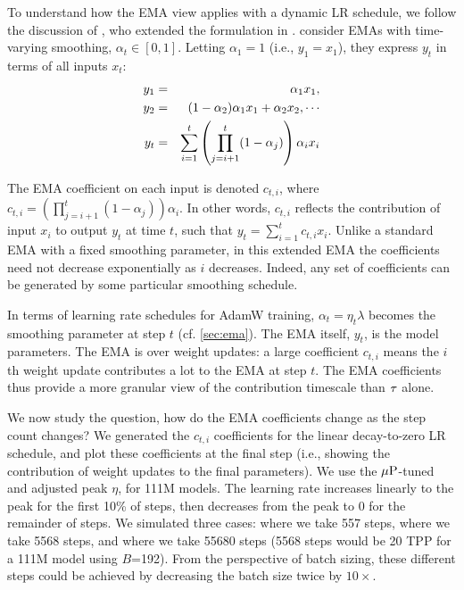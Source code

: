 To understand how the EMA view applies with a dynamic LR schedule, we
follow the discussion of \citet{bergsma2025straight}, who extended the
formulation in \citet{wang2024how}.
%
\citet{bergsma2025straight} consider EMAs with time-varying smoothing,
$\alpha_t \in [0, 1]$.  Letting $\alpha_1=1$ (i.e., $y_1=x_1$), they
express $y_t$ in terms of all inputs $x_t$:
\begin{eqnarray}\label{eqn:extended_ema}
  y_1 &=& \alpha_1 x_1  \notag, \\
  y_2 &=& (1 - \alpha_2) \alpha_1 x_1 + \alpha_2 x_2, \cdots  \notag \\
  y_t &=& \sum_{i=1}^t \left( \prod_{j=i+1}^{t} (1 - \alpha_j) \right) \alpha_i x_i
\end{eqnarray}

The EMA coefficient on each input is denoted $c_{t,i}$, where
%
\mbox{$c_{t,i} = \left( \prod_{j=i+1}^{t} (1 - \alpha_j) \right)
  \alpha_i$}.
%
In other words, $c_{t,i}$ reflects the contribution of input $x_i$ to
output $y_t$ at time $t$, such that
%
$y_t = \sum_{i=1}^t c_{t,i} x_i$.
%
Unlike a standard EMA with a fixed smoothing parameter, in this
extended EMA the coefficients need not decrease exponentially as $i$
decreases.  Indeed, any set of coefficients can be generated by some
particular smoothing schedule.



In terms of learning rate schedules for AdamW training, $\alpha_t =
\eta_t\lambda$ becomes the smoothing parameter at step $t$
(cf. \cref{sec:ema}).  The EMA itself, $y_t$, is the model parameters.
The EMA is over weight updates: a large coefficient $c_{t,i}$ means
the $i$th weight update contributes a lot to the EMA at step $t$.  The
EMA coefficients thus provide a more granular view of the contribution
timescale than $\tau$ alone.

We now study the question, how do the EMA coefficients change as the
step count changes?
%
We generated the $c_{t,i}$ coefficients for the linear decay-to-zero
LR schedule, and plot these coefficients at the final step (i.e.,
showing the contribution of weight updates to the final parameters).
%
We use the $\mbox{$\mu$P}$-tuned and adjusted peak $\eta$, for 111M models.
%
The learning rate increases linearly to the peak for the first 10\% of
steps, then decreases from the peak to 0 for the remainder of steps.
We simulated three cases: where we take 557 steps, where we take 5568
steps, and where we take 55680 steps (5568 steps would be 20 TPP for a
111M model using $B$=192).
%
From the perspective of batch sizing, these different steps could be
achieved by decreasing the batch size twice by $10\times$.

